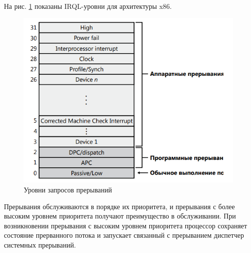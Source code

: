 На рис. \ref{img:irql} показаны IRQL-уровни для архитектуры x86.

\begin{figure}[H]
	\begin{center}
		\includegraphics[scale=0.9]{img/irql.png}
	\end{center}
	\captionsetup{justification=centering}
	\caption{Уровни запросов прерываний}
	\label{img:irql}
\end{figure}

Прерывания обслуживаются в порядке их приоритета, и прерывания с более
высоким уровнем приоритета получают преимущество в обслуживании. При
возникновении прерывания с высоким уровнем приоритета процессор сохраняет состояние прерванного потока и запускает связанный с прерыванием диспетчер системных прерываний. 

